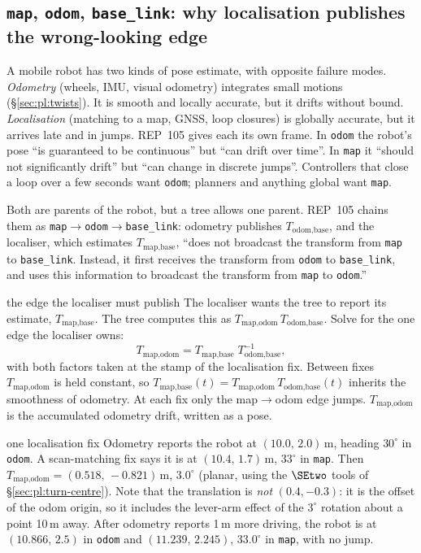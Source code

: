 \subsection{\texttt{map}, \texttt{odom}, \texttt{base\_link}: why localisation publishes the wrong-looking edge}\label{sec:rot:tf-map-odom}

A mobile robot has two kinds of pose estimate, with opposite failure modes. \emph{Odometry} (wheels, IMU, visual odometry) integrates small motions (\S\ref{sec:pl:twists}). It is smooth and locally accurate, but it drifts without bound. \emph{Localisation} (matching to a map, GNSS, loop closures) is globally accurate, but it arrives late and in jumps. REP~105 gives each its own frame. In \texttt{odom} the robot's pose ``is guaranteed to be continuous'' but ``can drift over time''. In \texttt{map} it ``should not significantly drift'' but ``can change in discrete jumps''. Controllers that close a loop over a few seconds want \texttt{odom}; planners and anything global want \texttt{map}.

Both are parents of the robot, but a tree allows one parent. REP~105 chains them as \texttt{map}$\to$\texttt{odom}$\to$\texttt{base\_link}: odometry publishes $T_{\text{odom},\text{base}}$, and the localiser, which estimates $T_{\text{map},\text{base}}$, ``does not broadcast the transform from \texttt{map} to \texttt{base\_link}. Instead, it first receives the transform from \texttt{odom} to \texttt{base\_link}, and uses this information to broadcast the transform from \texttt{map} to \texttt{odom}.''

\begin{deriv}{the edge the localiser must publish}
The localiser wants the tree to report its estimate, $T_{\text{map},\text{base}}$. The tree computes this as $T_{\text{map},\text{odom}}\,T_{\text{odom},\text{base}}$. Solve for the one edge the localiser owns:
\[
T_{\text{map},\text{odom}}=T_{\text{map},\text{base}}\;T_{\text{odom},\text{base}}^{-1},
\]
with both factors taken at the stamp of the localisation fix. Between fixes $T_{\text{map},\text{odom}}$ is held constant, so $T_{\text{map},\text{base}}(t)=T_{\text{map},\text{odom}}\,T_{\text{odom},\text{base}}(t)$ inherits the smoothness of odometry. At each fix only the map$\to$odom edge jumps. $T_{\text{map},\text{odom}}$ is the accumulated odometry drift, written as a pose.
\end{deriv}

\begin{example}{one localisation fix}
Odometry reports the robot at $(10.0,\,2.0)$\,m, heading $30^\circ$ in \texttt{odom}. A scan-matching fix says it is at $(10.4,\,1.7)$\,m, $33^\circ$ in \texttt{map}. Then $T_{\text{map},\text{odom}}=(0.518,\,-0.821)$\,m, $3.0^\circ$ (planar, using the $\SEtwo$ tools of \S\ref{sec:pl:turn-centre}). Note that the translation is \emph{not} $(0.4,-0.3)$: it is the offset of the odom origin, so it includes the lever-arm effect of the $3^\circ$ rotation about a point 10\,m away. After odometry reports 1\,m more driving, the robot is at $(10.866,\,2.5)$ in \texttt{odom} and $(11.239,\,2.245)$, $33.0^\circ$ in \texttt{map}, with no jump.
\end{example}

